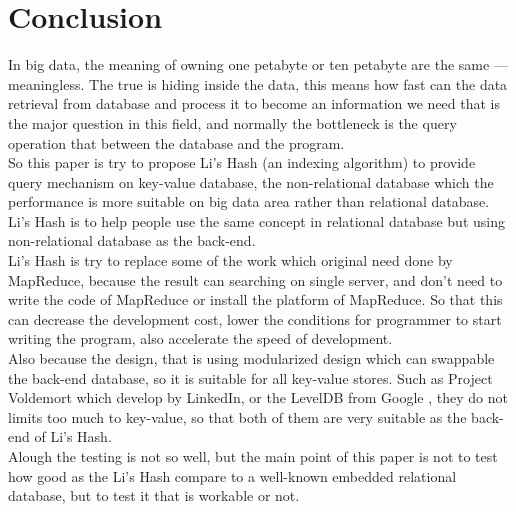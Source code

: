 \chapter{Conclusion}
\label{chapter:conclusion}

\baselineskip=26pt
\thispagestyle{empty}

In big data, the meaning of owning one petabyte or ten petabyte are the same --- meaningless. The true is hiding inside the data, this means how fast can the data retrieval from database and process it to become an information we need that is the major question in this field, and normally the bottleneck is the query operation that between the database \cite{paper:nodb} and the program.\\

So this paper is try to propose Li's Hash (an indexing algorithm) to provide query mechanism on key-value database, the non-relational database which the performance is more suitable on big data area rather than relational database. Li's Hash is to help people use the same concept in relational database but using non-relational database as the back-end.\\

Li's Hash is try to replace some of the work which original need done by MapReduce, because the result can searching on single server, and don't need to write the code of MapReduce or install the platform of MapReduce. So that this can decrease the development cost, lower the conditions for programmer to start writing the program, also accelerate the speed of development.\\

Also because the design, that is using modularized design which can swappable the back-end database, so it is suitable for all key-value stores. Such as Project Voldemort \cite{web:voldemort:home-page} which develop by LinkedIn, or the LevelDB from Google \cite{web:wiki:leveldb}, they do not limits too much to key-value, so that both of them are very suitable as the back-end of Li's Hash.\\

Alough the testing is not so well, but the main point of this paper is not to test how good as the Li's Hash compare to a well-known embedded relational database, but to test it that is workable or not.\\


